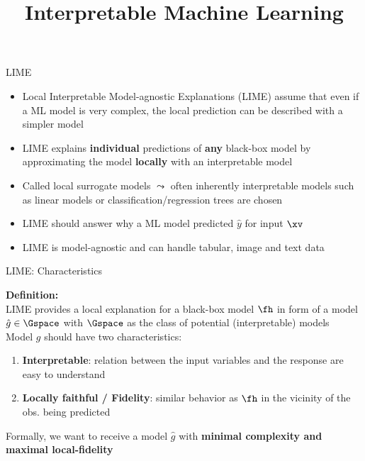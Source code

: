 \documentclass[11pt,compress,t,notes=noshow, aspectratio=169, xcolor=table]{beamer}
\title{Interpretable Machine Learning}
\date{}
\newcommand{\gh}{\hat{g}}
\begin{document}
	




\newcommand{\titlefigure}{figure/lime5}
\newcommand{\learninggoals}{
	\item Understand motivation for LIME
	\item Develop a mathematical intuition}



\begin{frame}[c]{LIME}
\begin{itemize}
		\item Local Interpretable Model-agnostic Explanations (LIME) assume that even if a ML model is very complex, the local prediction can be described with a simpler model
		\smallskip\pause
		\item  LIME explains \textbf{individual} predictions of \textbf{any} black-box model by approximating the model \textbf{locally} with an interpretable model
		\smallskip\pause
		\item Called local surrogate models $\leadsto$ often inherently interpretable models such as linear models or classification/regression trees are chosen\\
		\smallskip\pause
		\item LIME should answer why a ML model predicted $\hat y$ for input $\xv$
		\smallskip\pause
		\item LIME is model-agnostic and can handle tabular, image and text data 
\end{itemize}
\end{frame}


\begin{frame}[c]{LIME: Characteristics}

    \textbf{Definition:}\\
	LIME provides a local explanation for a black-box model $\fh$ in form of a model $\gh \in \Gspace$ with $\Gspace$ as the class of potential (interpretable) models\\[2em]
	
	
	Model $g$ should have two characteristics:
	\begin{enumerate}
		\item \textbf{Interpretable}: relation between the input variables and the response are easy to understand  
		\item \textbf{Locally faithful / Fidelity}: similar behavior as $\fh$ in the vicinity of the obs. being predicted
	\end{enumerate}
	
	\vspace{2em}
	Formally, we want to receive a model $\gh$ with \textbf{minimal complexity and maximal local-fidelity} 
\end{frame}
\end{document}

